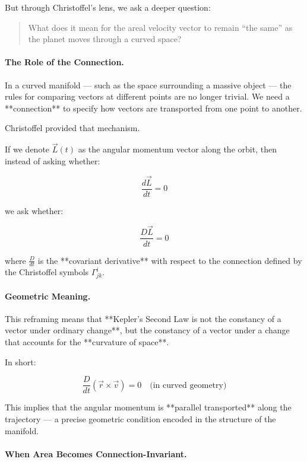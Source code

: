 But through Christoffel’s lens, we ask a deeper question:

\begin{quote}
What does it mean for the areal velocity vector to remain “the same” as the planet moves through a curved space?
\end{quote}

\bigskip

\paragraph{The Role of the Connection.}

In a curved manifold — such as the space surrounding a massive object — the rules for comparing vectors at different points are no longer trivial.  
We need a **connection** to specify how vectors are transported from one point to another.

Christoffel provided that mechanism.

If we denote \( \vec{L}(t) \) as the angular momentum vector along the orbit, then instead of asking whether:

\[
\frac{d\vec{L}}{dt} = 0
\]

we ask whether:

\[
\frac{D\vec{L}}{dt} = 0
\]

where \( \frac{D}{dt} \) is the **covariant derivative** with respect to the connection defined by the Christoffel symbols \( \Gamma^i_{jk} \).

\bigskip

\paragraph{Geometric Meaning.}

This reframing means that **Kepler’s Second Law is not the constancy of a vector under ordinary change**,  
but the constancy of a vector under a change that accounts for the **curvature of space**.

In short:

\[
\frac{D}{dt} (\vec{r} \times \vec{v}) = 0
\quad \text{(in curved geometry)}
\]

This implies that the angular momentum is **parallel transported** along the trajectory —  
a precise geometric condition encoded in the structure of the manifold.

\bigskip

\paragraph{When Area Becomes Connection-Invariant.}


